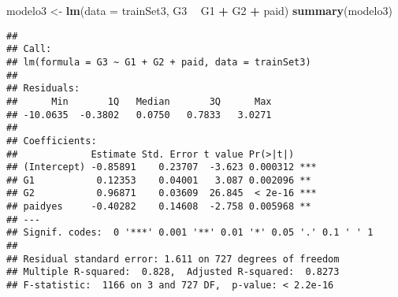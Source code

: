 \documentclass[
]{article}
\newenvironment{Shaded}{\begin{snugshade}}{\end{snugshade}}
\newcommand{\DataTypeTok}[1]{\textcolor[rgb]{0.13,0.29,0.53}{#1}}
\newcommand{\KeywordTok}[1]{\textcolor[rgb]{0.13,0.29,0.53}{\textbf{#1}}}
\newcommand{\NormalTok}[1]{#1}
\newcommand{\OperatorTok}[1]{\textcolor[rgb]{0.81,0.36,0.00}{\textbf{#1}}}
\newcommand{\StringTok}[1]{\textcolor[rgb]{0.31,0.60,0.02}{#1}}
\begin{document}
\begin{Shaded}
\begin{Highlighting}[]
\NormalTok{modelo3 <-}\StringTok{ }\KeywordTok{lm}\NormalTok{(}\DataTypeTok{data =}\NormalTok{ trainSet3, G3 }\OperatorTok{~}\StringTok{ }\NormalTok{G1 }\OperatorTok{+}\StringTok{ }\NormalTok{G2 }\OperatorTok{+}\StringTok{ }\NormalTok{paid)}
\KeywordTok{summary}\NormalTok{(modelo3)}
\end{Highlighting}
\end{Shaded}

\begin{verbatim}
## 
## Call:
## lm(formula = G3 ~ G1 + G2 + paid, data = trainSet3)
## 
## Residuals:
##      Min       1Q   Median       3Q      Max 
## -10.0635  -0.3802   0.0750   0.7833   3.0271 
## 
## Coefficients:
##             Estimate Std. Error t value Pr(>|t|)    
## (Intercept) -0.85891    0.23707  -3.623 0.000312 ***
## G1           0.12353    0.04001   3.087 0.002096 ** 
## G2           0.96871    0.03609  26.845  < 2e-16 ***
## paidyes     -0.40282    0.14608  -2.758 0.005968 ** 
## ---
## Signif. codes:  0 '***' 0.001 '**' 0.01 '*' 0.05 '.' 0.1 ' ' 1
## 
## Residual standard error: 1.611 on 727 degrees of freedom
## Multiple R-squared:  0.828,  Adjusted R-squared:  0.8273 
## F-statistic:  1166 on 3 and 727 DF,  p-value: < 2.2e-16
\end{verbatim}

\begin{Shaded}
\end{Shaded}
\end{document}
